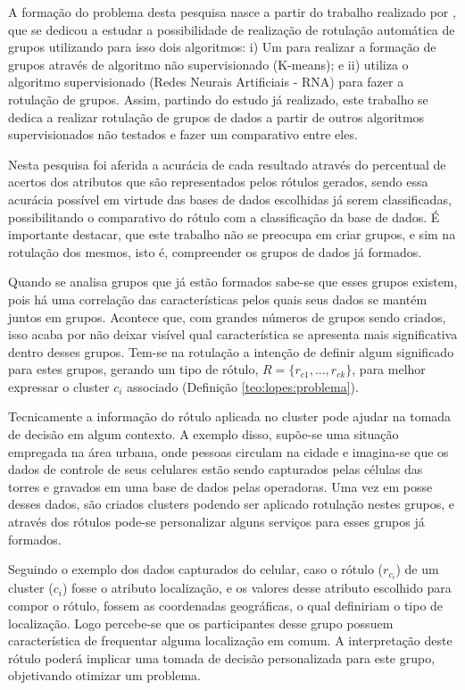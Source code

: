 A formação do problema desta pesquisa nasce a partir do trabalho realizado por \cite{LOPES2014}, que se dedicou a estudar a possibilidade de realização de rotulação automática de grupos utilizando para isso dois algoritmos: i) Um para realizar a formação de grupos através de algoritmo não supervisionado (K-means); e ii) utiliza o algoritmo supervisionado (Redes Neurais Artificiais - RNA) para fazer a rotulação de grupos. Assim, partindo do estudo já realizado, este trabalho se dedica a realizar rotulação de grupos de dados a partir de outros algoritmos supervisionados não testados e fazer um comparativo entre eles.

Nesta pesquisa foi aferida a acurácia de cada resultado através do percentual de acertos dos atributos que são representados pelos rótulos gerados, sendo essa acurácia possível em virtude das bases de dados escolhidas já serem classificadas, possibilitando o comparativo do rótulo com a classificação da base de dados. É importante destacar, que este trabalho não se preocupa em criar grupos, e sim na rotulação dos mesmos, isto é, compreender os grupos de dados já formados.

Quando se analisa grupos que já estão formados sabe-se que esses grupos existem, pois há uma correlação das características pelos quais seus dados se mantém juntos em grupos. Acontece que, com grandes números de grupos sendo criados, isso acaba por não deixar visível qual característica se apresenta mais significativa dentro desses grupos. Tem-se na rotulação a intenção de definir algum significado para estes grupos, gerando um tipo de rótulo, ${ R=\{ r_{c1},...,r_{ck} \} }$, para melhor expressar o cluster ${c_i}$ associado (Definição \ref{teo:lopes:problema}).

Tecnicamente a informação do rótulo aplicada no cluster pode ajudar na tomada de decisão em algum contexto. A exemplo disso, supõe-se uma situação empregada na área urbana, onde pessoas circulam na cidade e imagina-se que os dados de controle de seus celulares estão sendo capturados pelas células das torres e gravados em uma base de dados pelas operadoras. Uma vez em posse desses dados, são criados clusters podendo ser aplicado rotulação nestes grupos, e através dos rótulos pode-se personalizar alguns serviços para esses grupos já formados. 

Seguindo o exemplo dos dados capturados do celular, caso o rótulo (${r_{c_i}}$) de um cluster (${c_i}$) fosse o atributo localização, e os valores desse atributo escolhido para compor o rótulo, fossem as coordenadas geográficas, o qual definiriam o tipo de localização. Logo percebe-se que os participantes desse grupo possuem característica de frequentar alguma localização em comum. A interpretação deste rótulo poderá implicar uma tomada de decisão personalizada para este grupo, objetivando otimizar um problema.


